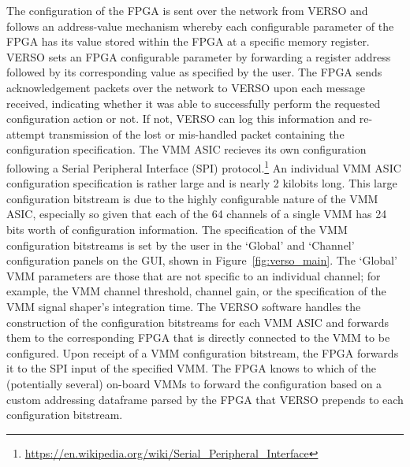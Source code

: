 \noindent The configuration of the FPGA is sent over the network from VERSO and
follows an address-value mechanism whereby each configurable parameter of the FPGA has its
value stored within the FPGA at a specific memory register.
VERSO sets an FPGA configurable parameter by forwarding a register address followed by its corresponding
value as specified by the user.
The FPGA sends acknowledgement packets over the network to VERSO upon each message received,
indicating whether it was able to successfully perform the requested configuration action or not.
If not, VERSO can log this information and re-attempt transmission of the lost or mis-handled packet
containing the configuration specification.
The VMM ASIC recieves its own configuration following a Serial Peripheral Interface (SPI) protocol.\footnote{\url{https://en.wikipedia.org/wiki/Serial_Peripheral_Interface}}
An individual VMM ASIC configuration specification is rather large and is nearly 2 kilobits long.
This large configuration bitstream is due to the highly configurable nature of the VMM ASIC, especially
so given that each of the 64 channels of a single VMM has 24 bits worth of configuration information.
The specification of the VMM configuration bitstreams is set by the user in the `Global' and `Channel' configuration
panels on the GUI, shown in Figure~\ref{fig:verso_main}.
The `Global' VMM parameters are those that are not specific to an individual channel; for example,
the VMM channel threshold, channel gain, or the specification of the VMM signal shaper's integration time.
The VERSO software handles the construction of the configuration bitstreams for each VMM ASIC and forwards
them to the corresponding FPGA that is directly connected to the VMM to be configured.
Upon receipt of a VMM configuration bitstream, the FPGA forwards it to the SPI input of the specified VMM.
The FPGA knows to which of the (potentially several) on-board VMMs to forward the configuration based on
a custom addressing dataframe parsed by the FPGA that VERSO prepends to each configuration bitstream.

